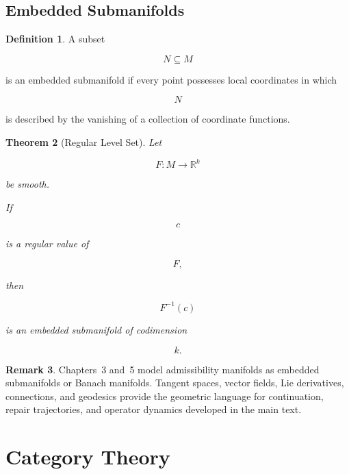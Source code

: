 \documentclass[11pt]{book}
\numberwithin{equation}{chapter}
\theoremstyle{definition}
\newtheorem{definition}{Definition}[chapter]
\newtheorem{remark}[definition]{Remark}
\theoremstyle{plain}
\newtheorem{theorem}[definition]{Theorem}
\begin{document}

\section{Embedded Submanifolds}

\begin{definition}

A subset

\[
N\subseteq M
\]

is an embedded submanifold if every point possesses local coordinates
in which

\[
N
\]

is described by the vanishing of a collection of coordinate functions.

\end{definition}


\begin{theorem}[Regular Level Set]

Let

\[
F:M\rightarrow\mathbb R^k
\]

be smooth.

If

\[
c
\]

is a regular value of

\[
F,
\]

then

\[
F^{-1}(c)
\]

is an embedded submanifold of codimension

\[
k.
\]

\end{theorem}


\begin{remark}

Chapters~3 and~5 model admissibility manifolds as embedded submanifolds
or Banach manifolds. Tangent spaces, vector fields, Lie derivatives,
connections, and geodesics provide the geometric language for
continuation, repair trajectories, and operator dynamics developed in
the main text.

\end{remark}

\chapter{Category Theory}
\end{document}
